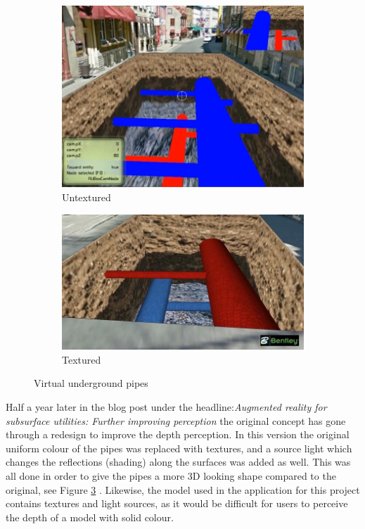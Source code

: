 \begin{figure}
	\centering
	\begin{subfigure}[h!]{\textwidth}
		\includegraphics[width=\textwidth]{figures/pipes_0.jpg}
		\caption{Untextured}\label{fig:pipes0}
	\end{subfigure}
	\begin{subfigure}[h!]{\textwidth}
		\includegraphics[width=\textwidth]{figures/pipes_1.jpg}
		\caption{Textured}\label{fig:pipes1}
	\end{subfigure}
	\caption{Virtual underground pipes \cite{Cote2011}}
\end{figure}

Half a year later in the blog post under the headline:\textit{Augmented reality for subsurface utilities: Further improving perception} the original concept has gone through a redesign to improve the depth perception. In this version the original uniform colour of the pipes was replaced with textures, and a source light which changes the reflections (shading) along the surfaces was added as well. This was all done in order to give the pipes a more 3D looking shape compared to the original, see Figure \ref{fig:pipes1} \cite{Cote2011}. Likewise, the model used in the application for this project contains textures and light sources, as it would be difficult for users to perceive the depth of a model with solid colour.

